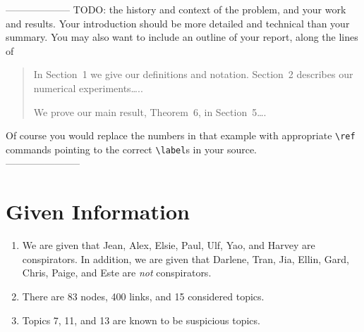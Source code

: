 \documentclass{icmmcm}
\begin{document}
\noindent -------------------- TODO:
the history and context of the problem,
and your work and results.  Your introduction should be more detailed
and technical than your summary.  You may also want to include an
outline of your report, along the lines of
\begin{quotation}
  In Section~1 we give our definitions and notation. Section~2
  describes our numerical experiments\ldots{}..
  
  We prove our main result, Theorem~6, in Section~5\ldots{}.
\end{quotation}
Of course you would replace the numbers in that example with
appropriate \verb|\ref| commands pointing to the correct
\verb|\label|s in your source.\\
-----------------------

\section{Given Information}
\begin{enumerate}
\item We are given that Jean, Alex, Elsie, Paul, Ulf, Yao,
and Harvey are conspirators. In addition, we are given that Darlene, Tran, Jia, Ellin, Gard, Chris,
Paige, and Este are \textit{not} conspirators.
\label{known_cons}
\item There are 83 nodes, 400 links, and 15 considered topics.\label{number}
\item Topics 7, 11, and 13 are known to be suspicious topics. \label{known_sus_topics}
\end{enumerate}
\end{document}
